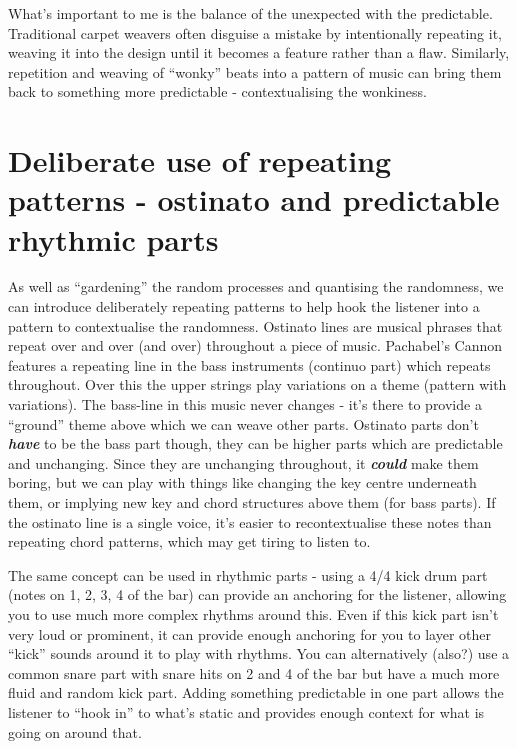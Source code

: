 \documentclass[
  12pt,
  letterpaper,
  oneside,
  open=any]{scrbook}
\begin{document}
What's important to me is the balance of the unexpected with the
predictable. Traditional carpet weavers often disguise a mistake by
intentionally repeating it, weaving it into the design until it becomes
a feature rather than a flaw. Similarly, repetition and weaving of
``wonky'' beats into a pattern of music can bring them back to something
more predictable - contextualising the wonkiness.

\section{Deliberate use of repeating patterns - ostinato and predictable
rhythmic
parts}\label{deliberate-use-of-repeating-patterns---ostinato-and-predictable-rhythmic-parts}

As well as ``gardening'' the random processes and quantising the
randomness, we can introduce deliberately repeating patterns to help
hook the listener into a pattern to contextualise the randomness.
Ostinato lines are musical phrases that repeat over and over (and over)
throughout a piece of music. Pachabel's Cannon features a repeating line
in the bass instruments (continuo part) which repeats throughout. Over
this the upper strings play variations on a theme (pattern with
variations). The bass-line in this music never changes - it's there to
provide a ``ground'' theme above which we can weave other parts.
Ostinato parts don't \textbf{\emph{have}} to be the bass part though,
they can be higher parts which are predictable and unchanging. Since
they are unchanging throughout, it \textbf{\emph{could}} make them
boring, but we can play with things like changing the key centre
underneath them, or implying new key and chord structures above them
(for bass parts). If the ostinato line is a single voice, it's easier to
recontextualise these notes than repeating chord patterns, which may get
tiring to listen to.

The same concept can be used in rhythmic parts - using a 4/4 kick drum
part (notes on 1, 2, 3, 4 of the bar) can provide an anchoring for the
listener, allowing you to use much more complex rhythms around this.
Even if this kick part isn't very loud or prominent, it can provide
enough anchoring for you to layer other ``kick'' sounds around it to
play with rhythms. You can alternatively (also?) use a common snare part
with snare hits on 2 and 4 of the bar but have a much more fluid and
random kick part. Adding something predictable in one part allows the
listener to ``hook in'' to what's static and provides enough context for
what is going on around that.
\end{document}
